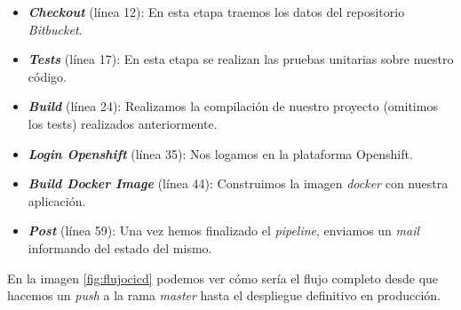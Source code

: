 \begin{itemize}
\item \textit{\textbf{Checkout}} (línea 12): En esta etapa traemos los datos del repositorio \textit{Bitbucket}. 

\item \textit{\textbf{Tests}} (línea 17): En esta etapa se realizan las pruebas unitarias sobre nuestro código.

\item \textit{\textbf{Build}} (línea 24): Realizamos la compilación de nuestro proyecto (omitimos los tests) realizados anteriormente.

\item \textit{\textbf{Login Openshift}} (línea 35): Nos logamos en la plataforma Openshift.

\item \textit{\textbf{Build Docker Image}} (línea 44): Construimos la imagen \textit{docker} con nuestra aplicación.

\item \textit{\textbf{Post}} (línea 59): Una vez hemos finalizado el \textit{pipeline}, enviamos un \textit{mail} informando del estado del mismo. 
 
\end{itemize}


En la imagen \ref{fig:flujocicd} podemos ver cómo sería el flujo completo desde que hacemos un \textit{push} a la rama \textit{master} hasta el despliegue definitivo en producción. 


